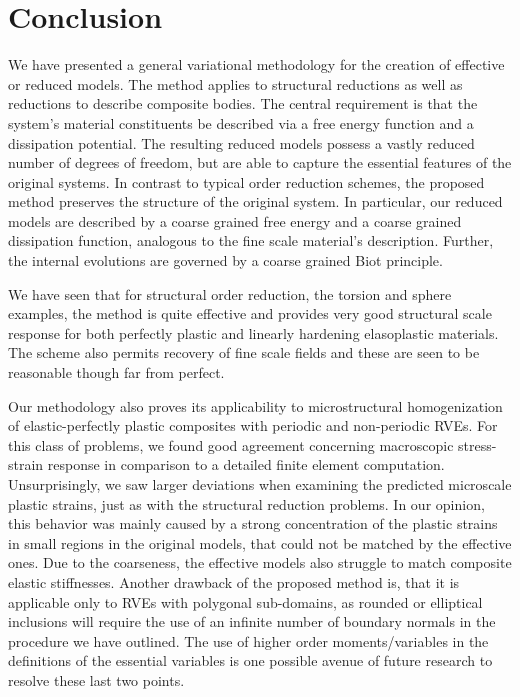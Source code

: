 \documentclass[final,1p,times]{elsarticle}
\begin{document}

\section{Conclusion}

We have presented a general variational methodology for the creation of effective or reduced models.
The method applies to structural reductions as well as reductions to describe composite bodies.  The central requirement is that the system's material constituents be described
via a free energy function and a dissipation potential.
The resulting reduced models possess a vastly reduced number of degrees of freedom, but are able to capture the essential features of the original systems. In contrast to typical order reduction schemes, the proposed method preserves the structure of the original system.  In particular, our reduced models are described by a coarse grained free energy and a coarse grained dissipation function, analogous to the fine scale material's description. Further, the internal evolutions are governed by a coarse grained Biot principle.

We have seen that for structural order reduction, the torsion and sphere examples, the method is quite effective and provides very good structural scale response for both perfectly plastic and linearly hardening elasoplastic materials.  The scheme also permits recovery of fine scale fields and these are seen to be reasonable though far from perfect.

Our methodology also proves its applicability to microstructural homogenization of elastic-perfectly plastic composites with periodic and non-periodic RVEs.  For this class of problems,
we found good agreement concerning macroscopic stress-strain response in comparison to a detailed finite element computation. Unsurprisingly, we saw larger deviations when examining the predicted microscale plastic strains, just as with the structural reduction problems. 
In our opinion, this behavior was mainly caused by a strong concentration of the plastic strains in small regions in the original models, that could not be matched by the effective ones.
Due to the coarseness, the effective models also struggle to match composite elastic stiffnesses.
Another drawback of the proposed method is, that it is applicable only to RVEs with polygonal sub-domains, as rounded or elliptical inclusions will require the use of an infinite number of boundary normals in the procedure we have outlined.
The use of higher order moments/variables in the definitions of the essential variables is one possible avenue of future research to resolve these last two points.
\end{document}
